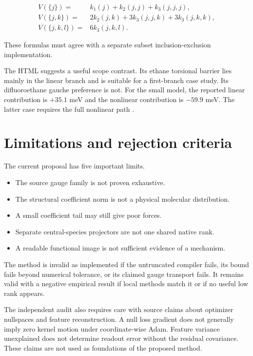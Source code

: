 \documentclass[10pt,twocolumn]{article}
\begin{document}
\begin{align}
V(\{j\})={}&k_1(j)+k_2(j,j)+k_3(j,j,j),\\
V(\{j,k\})={}&2k_2(j,k)+3k_3(j,j,k)
+3k_3(j,k,k),\\
V(\{j,k,l\})={}&6k_3(j,k,l).
\label{eq:body}
\end{align}

These formulas must agree with a separate subset inclusion-exclusion implementation.

The HTML suggests a useful scope contrast. Its ethane torsional barrier lies mainly in the linear branch and is suitable for a first-branch case study. Its difluoroethane gauche preference is not. For the small model, the reported linear contribution is $+35.1$ meV and the nonlinear contribution is $-59.9$ meV. The latter case requires the full nonlinear path \citep{olloqui2026inside}.

\section{Limitations and rejection criteria}

The current proposal has five important limits.

\begin{itemize}[leftmargin=1.3em]
\item The source gauge family is not proven exhaustive.
\item The structural coefficient norm is not a physical molecular distribution.
\item A small coefficient tail may still give poor forces.
\item Separate central-species projectors are not one shared native rank.
\item A readable functional image is not sufficient evidence of a mechanism.
\end{itemize}

The method is invalid as implemented if the untruncated compiler fails, its bound fails beyond numerical tolerance, or its claimed gauge transport fails. It remains valid with a negative empirical result if local methods match it or if no useful low rank appears.

The independent audit also requires care with source claims about optimizer nullspaces and feature reconstruction. A null loss gradient does not generally imply zero kernel motion under coordinate-wise Adam. Feature variance unexplained does not determine readout error without the residual covariance. These claims are not used as foundations of the proposed method.
\end{document}
